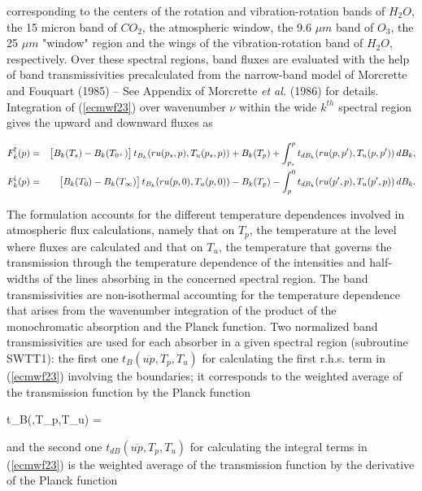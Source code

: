 \noindent corresponding to the centers of the rotation and vibration-rotation bands of $H_2O$, the 15 micron band of $CO_2$, the atmospheric window, the 9.6 $\mu m$ band of $O_3$, the 25 $\mu m$ "window" region and the wings of the vibration-rotation band of $H_2O$, respectively. Over these spectral regions, band fluxes are evaluated with the help of band transmissivities precalculated from the narrow-band model of Morcrette and Fouquart (1985) -- See Appendix of Morcrette {\em et al.} (1986) for details.\\

Integration of (\ref{ecmwf23}) over wavenumber $\nu$ within the wide $k^{th}$
spectral region gives the upward and downward fluxes as

\medskip
\begin{eqnarray}\label{ecmwf25}
F_{k}^{\!\uparrow}(p) &=&
\bigl[B_{k}(T_s) - B_{k}(T_{0^{+}})\bigr] \, t_{B_k}(ru(p_s,p),T_u(p_s,p))
+ B_{k}(T_p) + \int_{p_s}^p{t_{dB_k}(ru(p,p'),T_u(p,p')) \, dB_{k}}, \cr
F_{k}^{\!\downarrow}(p) &=&
\bigl[B_{k}(T_0) - B_{k}(T_{\infty})\bigr] \, t_{B_k}(ru(p,0),T_u(p,0))
- B_{k}(T_p) - \int_{p}^0{t_{dB_k}(ru(p',p),T_u(p',p)) \, dB_{k}}.
\end{eqnarray}
\medskip

The formulation accounts for the different temperature dependences involved in atmospheric flux calculations, namely that on $T_p$, the temperature at the level where fluxes are calculated and that on $T_u$, the temperature that governs the transmission through the temperature dependence of the intensities and half-widths of the lines absorbing in the concerned spectral region. The band transmissivities are non-isothermal accounting for the temperature dependence that arises from the wavenumber integration of the product of the monochromatic absorption and the Planck function. Two normalized band transmissivities are used for each absorber in a given spectral region (subroutine SWTT1): the first one $t_B(\overline{up},T_p,T_u)$ for calculating the first r.h.s. term in (\ref{ecmwf23}) involving the boundaries; it corresponds to the weighted average of the transmission function by the Planck function

\medskip
\be
t_B(,T_p,T_u) = 
\label{ecmwf26a}
\ee
\medskip

\noindent and the second one $t_{dB}(\overline{up},T_p,T_u)$ for calculating the integral terms in (\ref{ecmwf23}) is the weighted average of the transmission function by the derivative of the Planck function

